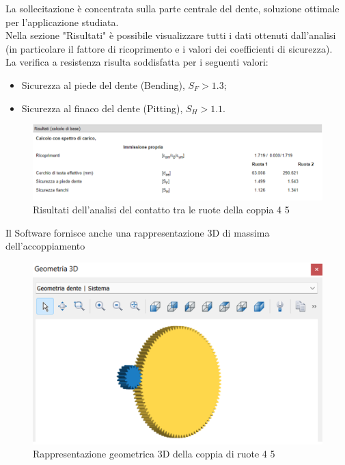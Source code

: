 La sollecitazione è concentrata sulla parte centrale del dente, soluzione ottimale per l’applicazione studiata. \\
Nella sezione "Risultati" è possibile visualizzare tutti i dati ottenuti dall’analisi (in particolare il fattore di ricoprimento e i valori dei coefficienti di sicurezza). \\
La verifica a resistenza risulta soddisfatta per i seguenti valori:
\begin{itemize}
    \item Sicurezza al piede del dente (Bending), $S_F>1.3$;
    \item Sicurezza al finaco del dente (Pitting), $S_H>1.1$.
    \end{itemize}
\begin{figure}[h]
    \centering
    \includegraphics[scale=0.49]{Immagini/RisultatiCoppia45.png}
    \caption{Risultati dell'analisi del contatto tra le ruote della coppia 4 5}
    \label{fig:RisultatiCoppia45}
\end{figure}
\newpage
Il Software fornisce anche una rappresentazione 3D di massima dell’accoppiamento
\begin{figure}[h]
    \centering
    \includegraphics[scale=0.5]{Immagini/GeometriaCoppia45.png}
    \caption{Rappresentazione geometrica 3D della coppia di ruote 4 5}
    \label{fig:GeometriaCoppia45}
\end{figure}
